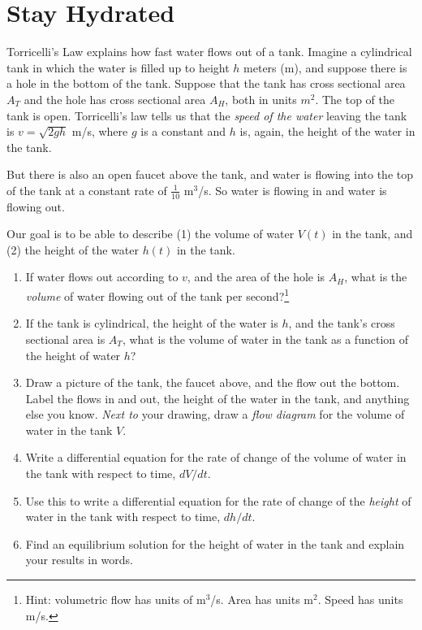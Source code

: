 \documentclass[11pt,onecolumn,superscriptaddress,notitlepage]{article}
\begin{document}
\section*{Stay Hydrated} 
Torricelli's Law explains how fast water flows out of a tank. Imagine a cylindrical tank in which the water is filled up to height $h$ meters (m), and suppose there is a hole in the bottom of the tank. Suppose that the tank has cross sectional area $A_T$ and the hole has cross sectional area $A_H$, both in units $m^2$. The top of the tank is open. Torricelli's law tells us that the {\it speed of the water} leaving the tank is $v = \sqrt{2 g h}$ m/s, where $g$ is a constant and $h$ is, again, the height of the water in the tank.  

But there is also an open faucet above the tank, and water is flowing into the top of the tank at a constant rate of $\frac{1}{10}$ m$^3$/s. So water is flowing in and water is flowing out. 

Our goal is to be able to describe (1) the volume of water $V(t)$ in the tank, and (2) the height of the water $h(t)$ in the tank. 

\begin{enumerate}[resume]
	\item If water flows out according to $v$, and the area of the hole is $A_H$, what is the {\it volume} of water flowing out of the tank per second?\footnote{Hint: volumetric flow has units of m$^3$/s. Area has units m$^2$. Speed has units m/s.}
	\item If the tank is cylindrical, the height of the water is $h$, and the tank's cross sectional area is $A_T$, what is the volume of water in the tank as a function of the height of water $h$?
	\item Draw a picture of the tank, the faucet above, and the flow out the bottom. Label the flows in and out, the height of the water in the tank, and anything else you know.  {\it Next to} your drawing, draw a {\it flow diagram} for the volume of water in the tank $V$.  
	\item Write a differential equation for the rate of change of the volume of water in the tank with respect to time, $dV/dt$.
	\item Use this to write a differential equation for the rate of change of the {\it height} of water in the tank with respect to time, $dh/dt$. 
	\item Find an equilibrium solution for the height of water in the tank and explain your results in words.
\end{enumerate}
\end{document}
